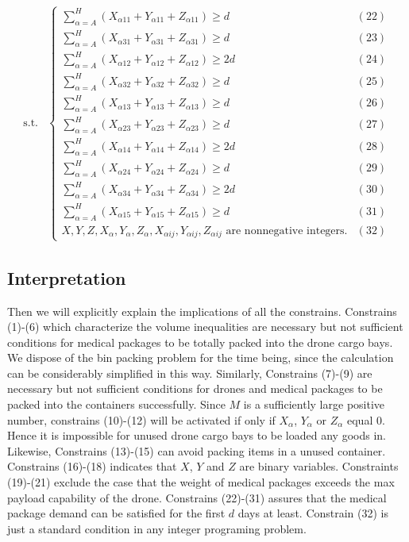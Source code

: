 \documentclass{mcmthesis}
\begin{document}
\[
\begin{aligned}
\text{s.t.}&
\left\{
\begin{array}{lr}
\sum\limits_{\alpha=A}^{H}(X_{\alpha 11}+Y_{\alpha 11}+Z_{\alpha 11})\ge d&(22)\\
\sum\limits_{\alpha=A}^{H}(X_{\alpha 31}+Y_{\alpha 31}+Z_{\alpha 31})\ge d&(23)\\
\sum\limits_{\alpha=A}^{H}(X_{\alpha 12}+Y_{\alpha 12}+Z_{\alpha 12})\ge 2d&(24)\\
\sum\limits_{\alpha=A}^{H}(X_{\alpha 32}+Y_{\alpha 32}+Z_{\alpha 32})\ge d&(25)\\
\sum\limits_{\alpha=A}^{H}(X_{\alpha 13}+Y_{\alpha 13}+Z_{\alpha 13})\ge d&(26)\\
\sum\limits_{\alpha=A}^{H}(X_{\alpha 23}+Y_{\alpha 23}+Z_{\alpha 23})\ge d&(27)\\
\sum\limits_{\alpha=A}^{H}(X_{\alpha 14}+Y_{\alpha 14}+Z_{\alpha 14})\ge 2d&(28)\\
\sum\limits_{\alpha=A}^{H}(X_{\alpha 24}+Y_{\alpha 24}+Z_{\alpha 24})\ge d&(29)\\
\sum\limits_{\alpha=A}^{H}(X_{\alpha 34}+Y_{\alpha 34}+Z_{\alpha 34})\ge 2d&(30)\\
\sum\limits_{\alpha=A}^{H}(X_{\alpha 15}+Y_{\alpha 15}+Z_{\alpha 15})\ge d&(31)\\
X,Y,Z,X_\alpha,Y_\alpha,Z_\alpha,X_{\alpha ij},Y_{\alpha ij},Z_{\alpha ij} \text{ are nonnegative integers.}&(32)

\end{array}
\right.
\end{aligned}
\]

\subsection{Interpretation}


\noindent Then we will explicitly explain the implications of all the constrains. Constrains (1)-(6) which characterize the volume inequalities are necessary but not sufficient conditions for medical packages to be totally packed into the drone cargo bays. We dispose of the bin packing problem for the time being, since the calculation can be considerably simplified in this way. Similarly, Constrains (7)-(9) are necessary but not sufficient conditions for drones and medical packages to be packed into the containers successfully. Since $M$ is a sufficiently large positive number, constrains (10)-(12) will be activated if only if $X_\alpha$, $Y_\alpha$ or $Z_\alpha$ equal 0. Hence it is impossible for unused drone cargo bays to be loaded any goods in. Likewise, Constrains (13)-(15) can avoid packing items in a unused container. Constrains (16)-(18) indicates that $X$, $Y$ and $Z$ are binary variables. Constraints (19)-(21) exclude the case that the weight of medical packages exceeds the max payload capability of the drone. Constrains (22)-(31) assures that the medical package demand can be satisfied for the first $d$ days at least. Constrain (32) is just a standard condition in any integer programing problem. 
\end{document}
